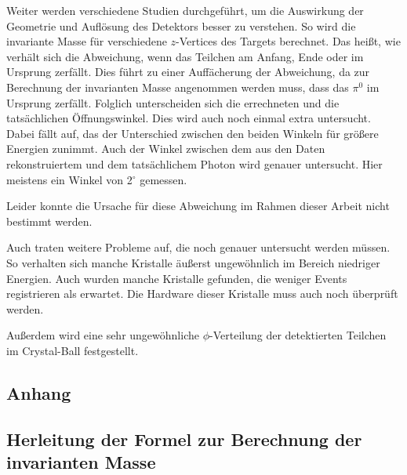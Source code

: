 \documentclass[a4paper,11pt,oneside,final,german,openbib,pdftex]{scrbook}
\begin{document}
{Weiter werden verschiedene Studien durchgef\"uhrt, um die Auswirkung der Geometrie und Aufl\"osung des Detektors besser zu verstehen. So wird die invariante Masse f\"ur verschiedene $z$-Vertices des Targets berechnet. Das hei{\ss}t, wie verh\"alt sich die Abweichung, wenn das Teilchen am Anfang, Ende oder im Ursprung zerf\"allt. Dies f\"uhrt zu einer Auff\"acherung der Abweichung, da zur Berechnung der invarianten Masse angenommen werden muss, dass das $\pi^0$ im Ursprung zerf\"allt. Folglich unterscheiden sich die errechneten und die tats\"achlichen \"Offnungswinkel. Dies wird auch noch einmal extra untersucht. Dabei f\"allt auf, das der Unterschied zwischen den beiden Winkeln f\"ur gr\"o{\ss}ere Energien zunimmt. Auch der Winkel zwischen dem aus den Daten rekonstruiertem und dem tats\"achlichem Photon wird genauer untersucht. Hier meistens ein Winkel von 2$^{\circ}$ gemessen.

Leider konnte die Ursache f\"ur diese Abweichung im Rahmen dieser Arbeit nicht bestimmt werden.
\newline

Auch traten weitere Probleme auf, die noch genauer untersucht werden m\"ussen. So verhalten sich manche Kristalle \"au{\ss}erst ungew\"ohnlich im Bereich niedriger Energien. Auch wurden manche Kristalle gefunden, die weniger Events registrieren als erwartet. Die Hardware dieser Kristalle muss auch noch \"uberpr\"uft werden. 

Au{\ss}erdem wird eine sehr ungew\"ohnliche $\phi$-Verteilung der detektierten Teilchen im Crystal-Ball festgestellt.





\begin{appendix}
\chapter{Anhang}
\section{Herleitung der Formel zur Berechnung der invarianten Masse}
\label{sec:Herleitung-der-Formel-zur-Berechnung-der-invarianten-Masse}


\end{appendix}}
\end{document}
